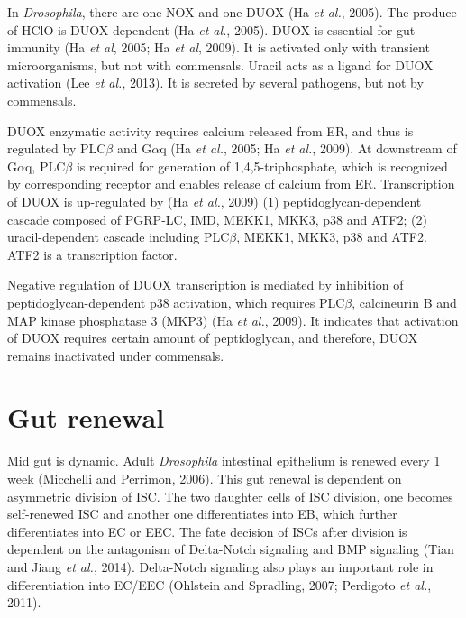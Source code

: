 \documentclass[11pt]{article}
\begin{document}
\newline

In \textit{Drosophila}, there are one NOX and one DUOX (Ha \textit{et al.}, 2005). 
The produce of HClO is DUOX-dependent (Ha \textit{et al.}, 2005). 
DUOX is essential for gut immunity (Ha \textit{et al}, 2005; Ha \textit{et al}, 2009). 
It is activated only with transient microorganisms, but not with commensals. 
Uracil acts as a ligand for DUOX activation (Lee \textit{et al.}, 2013). 
It is secreted by several pathogens, but not by commensals.

\newline

DUOX enzymatic activity requires calcium released from ER, and thus is regulated by PLC$\beta$ and G$\alpha$q (Ha \textit{et al.}, 2005; Ha \textit{et al.}, 2009). 
At downstream of G$\alpha$q, PLC$\beta$ is required for generation of 1,4,5-triphosphate, which is recognized by corresponding receptor and enables release of calcium from ER. 
Transcription of DUOX is up-regulated by (Ha \textit{et al.}, 2009) 
(1) peptidoglycan-dependent cascade composed of PGRP-LC, IMD, MEKK1, MKK3, p38 and ATF2; 
(2) uracil-dependent cascade including PLC$\beta$, MEKK1, MKK3, p38 and ATF2. 
ATF2 is a transcription factor. 

\newline

Negative regulation of DUOX transcription is mediated by inhibition of peptidoglycan-dependent p38 activation, which requires PLC$\beta$, calcineurin B and MAP kinase phosphatase 3 (MKP3) (Ha \textit{et al.}, 2009). 
It indicates that activation of DUOX requires certain amount of peptidoglycan, and therefore, DUOX remains inactivated under commensals.

\section{Gut renewal}
Mid gut is dynamic. 
Adult \textit{Drosophila} intestinal epithelium is renewed every 1 week (Micchelli and Perrimon, 2006). 
This gut renewal is dependent on asymmetric division of ISC. 
The two daughter cells of ISC division, one becomes self-renewed ISC and another one differentiates into EB, which further differentiates into EC or EEC. 
The fate decision of ISCs after division is dependent on the antagonism of Delta-Notch signaling and BMP signaling (Tian and Jiang \textit{et al.}, 2014). 
Delta-Notch signaling also plays an important role in differentiation into EC/EEC (Ohlstein and Spradling, 2007; Perdigoto \textit{et al.}, 2011). 
\end{document}
